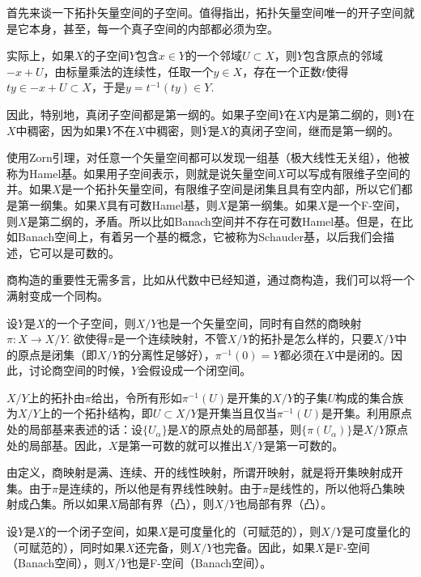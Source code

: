 \begin{para}\label{1.43}
	首先来谈一下拓扑矢量空间的子空间。值得指出，拓扑矢量空间唯一的开子空间就是它本身，甚至，每一个真子空间的内部都必须为空。

	实际上，如果$X$的子空间$Y$包含$x\in Y$的一个邻域$U\subset X$，则$Y$包含原点的邻域$-x+U$，由标量乘法的连续性，任取一个$y\in X$，存在一个正数$t$使得$ty\in -x+U\subset X$，于是$y=t^{-1}(ty)\in Y$.

	因此，特别地，真闭子空间都是第一纲的。如果子空间$Y$在$X$内是第二纲的，则$Y$在$X$中稠密，因为如果$Y$不在$X$中稠密，则$\overline{Y}$是$X$的真闭子空间，继而是第一纲的。
\end{para}

使用Zorn引理，对任意一个矢量空间都可以发现一组基（极大线性无关组），他被称为Hamel基。如果用子空间表示，则就是说矢量空间$X$可以写成有限维子空间的并。如果$X$是一个拓扑矢量空间，有限维子空间是闭集且具有空内部，所以它们都是第一纲集。如果$X$具有可数Hamel基，则$X$是第一纲集。如果$X$是一个F-空间，则$X$是第二纲的，矛盾。所以比如Banach空间并不存在可数Hamel基。但是，在比如Banach空间上，有着另一个基的概念，它被称为Schauder基，以后我们会描述，它可以是可数的。

\begin{para}
	商构造的重要性无需多言，比如从代数中已经知道，通过商构造，我们可以将一个满射变成一个同构。

	设$Y$是$X$的一个子空间，则$X/Y$也是一个矢量空间，同时有自然的商映射$\pi:X\to X/Y$. 欲使得$\pi$是一个连续映射，不管$X/Y$的拓扑是怎么样的，只要$X/Y$中的原点是闭集（即$X/Y$的分离性足够好），$\pi^{-1}(0)=Y$都必须在$X$中是闭的。因此，讨论商空间的时候，$Y$会假设成一个闭空间。

	$X/Y$上的拓扑由$\pi$给出，令所有形如$\pi^{-1}(U)$是开集的$X/Y$的子集$U$构成的集合族为$X/Y$上的一个拓扑结构，即$U\subset X/Y$是开集当且仅当$\pi^{-1}(U)$是开集。利用原点处的局部基来表述的话：设$\{U_\alpha\}$是$X$的原点处的局部基，则$\{\pi(U_\alpha)\}$是$X/Y$原点处的局部基。因此，$X$是第一可数的就可以推出$X/Y$是第一可数的。

	由定义，商映射是满、连续、开的线性映射，所谓开映射，就是将开集映射成开集。由于$\pi$是连续的，所以他是有界线性映射。由于$\pi$是线性的，所以他将凸集映射成凸集。所以如果$X$局部有界（凸），则$X/Y$也局部有界（凸）。
\end{para}

\begin{pro}\label{1.48}
	设$Y$是$X$的一个闭子空间，如果$X$是可度量化的（可赋范的），则$X/Y$是可度量化的（可赋范的），同时如果$X$还完备，则$X/Y$也完备。因此，如果$X$是F-空间（Banach空间），则$X/Y$也是F-空间（Banach空间）。
\end{pro}

